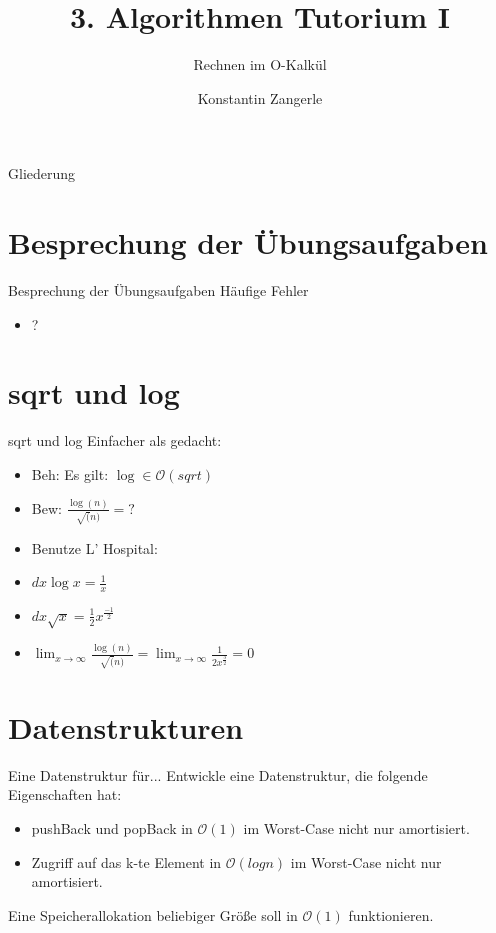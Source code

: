 \documentclass[18pt]{beamer}
\title[Algo I Tut]{3. Algorithmen Tutorium I}
\subtitle{Rechnen im O-Kalkül}
\author[Zangerle]{Konstantin Zangerle}
\institute{Institut für Theoretische Informatik}
\newcommand{\Oh}{\mathcal{O}}
\begin{document}

\begin{frame}
\titlepage
\end{frame}

\begin{frame}{Gliederung}
 \tableofcontents
\end{frame}

\section{Besprechung der Übungsaufgaben}
\begin{frame}{Besprechung der Übungsaufgaben}
Häufige Fehler
\begin{itemize}
 \item ?
\end{itemize}

\end{frame}

\section{sqrt und log}
\begin{frame}{sqrt und log}
Einfacher als gedacht: \pause
 \begin{itemize}
  \item Beh: Es gilt: $\log \in \Oh(sqrt)$
  \item Bew: $\frac{\log(n)}{\sqrt(n)} = ?$ \pause
  \item Benutze L' Hospital:
  \item $dx \log x = \frac{1}{x}$
  \item $dx \sqrt x = \frac{1}{2} x^\frac{-1}{2}$
  \item $\lim_{x \to \infty} \frac{\log(n)}{\sqrt(n)} = \lim_{x \to \infty} \frac{1}{2 x^\frac{3}{2}} = 0$
 \end{itemize}

\end{frame}

\section{Datenstrukturen}

\begin{frame}{Eine Datenstruktur für...}
 Entwickle eine Datenstruktur, die folgende Eigenschaften hat:
 \begin{itemize}
  \item pushBack und popBack in $\Oh(1)$ im Worst-Case nicht nur amortisiert.
  \item Zugriff auf das k-te Element in $\Oh(log n)$ im Worst-Case nicht nur amortisiert.
 \end{itemize}
Eine Speicherallokation beliebiger Größe soll in $\Oh(1)$ funktionieren.
\end{frame}
\end{document}
